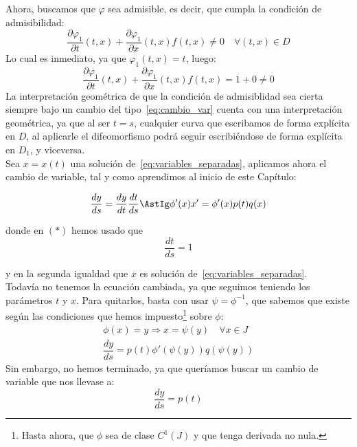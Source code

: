 \noindent
Ahora, buscamos que $\varphi$ sea admisible, es decir, que cumpla la condición de admisibilidad:
\begin{equation*}
    \dfrac{\partial\varphi_1}{\partial t}(t,x) + \dfrac{\partial \varphi_1}{\partial x}(t,x)f(t,x) \neq 0 \quad \forall (t,x)\in D
\end{equation*}
Lo cual es inmediato, ya que $\varphi_1(t,x)=t$, luego:
\begin{equation*}
    \dfrac{\partial\varphi_1}{\partial t}(t,x) + \dfrac{\partial \varphi_1}{\partial x}(t,x)f(t,x) = 1 + 0 \neq 0
\end{equation*}
La interpretación geométrica de que la condición de admisiblidad sea cierta siempre bajo un cambio del tipo~\ref{eq:cambio_var} cuenta con una interpretación geométrica, ya que al ser $t=s$, cualquier curva que escribamos de forma explícita en $D$, al aplicarle el difeomorfismo podrá seguir escribiéndose de forma explícita en $D_1$, y viceversa.\\

\noindent
Sea $x=x(t)$ una solución de~\ref{eq:variables_separadas}, aplicamos ahora el cambio de variable, tal y como aprendimos al inicio de este Capítulo:

\begin{equation*}
    \dfrac{dy}{ds} = \dfrac{dy}{dt} \dfrac{dt}{ds}\AstIg \phi'(x)x' = \phi'(x)p(t)q(x)
\end{equation*}

donde en $(\ast)$ hemos usado que
\begin{equation*}
    \dfrac{dt}{ds} = 1
\end{equation*}

y en la segunda igualdad que $x$ es solución de~\ref{eq:variables_separadas}.\\

\noindent
Todavía no tenemos la ecuación cambiada, ya que seguimos teniendo los parámetros $t$ y $x$. Para quitarlos, basta con usar $\psi = \phi^{-1}$, que sabemos que existe según las condiciones que hemos impuesto\footnote{Hasta ahora, que $\phi$ sea de clase $C^1(J)$ y que tenga derivada no nula.} sobre $\phi$:
\begin{gather*}
    \phi(x) = y \Longrightarrow x = \psi(y) \quad \forall x\in J \\
    \dfrac{dy}{ds} = p(t)\phi'(\psi(y))q(\psi(y))
\end{gather*}
Sin embargo, no hemos terminado, ya que queríamos buscar un cambio de variable que nos llevase a:
\begin{equation*}
    \dfrac{dy}{ds} = p(t)
\end{equation*}

